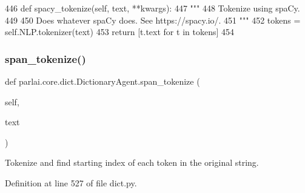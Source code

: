 \begin{DoxyCode}
446     \textcolor{keyword}{def }spacy\_tokenize(self, text, **kwargs):
447         \textcolor{stringliteral}{"""}
448 \textcolor{stringliteral}{        Tokenize using spaCy.}
449 \textcolor{stringliteral}{}
450 \textcolor{stringliteral}{        Does whatever spaCy does. See https://spacy.io/.}
451 \textcolor{stringliteral}{        """}
452         tokens = self.NLP.tokenizer(text)
453         \textcolor{keywordflow}{return} [t.text \textcolor{keywordflow}{for} t \textcolor{keywordflow}{in} tokens]
454 
\end{DoxyCode}
\mbox{\label{classparlai_1_1core_1_1dict_1_1DictionaryAgent_a8fede3cf83af6a47c5dd4bb356de3350}} 
\subsubsection{\texorpdfstring{span\+\_\+tokenize()}{span\_tokenize()}}
{\footnotesize\ttfamily def parlai.\+core.\+dict.\+Dictionary\+Agent.\+span\+\_\+tokenize (\begin{DoxyParamCaption}\item[{}]{self,  }\item[{}]{text }\end{DoxyParamCaption})}

\begin{DoxyVerb}Tokenize and find  starting index of each token in the original string.
\end{DoxyVerb}
 

Definition at line 527 of file dict.\+py.


